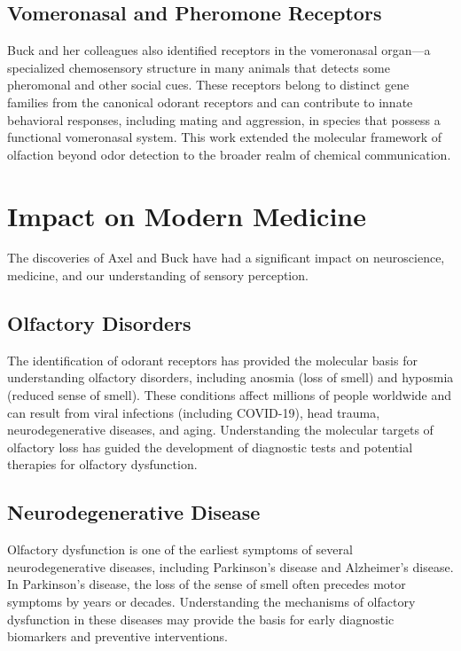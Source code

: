 \subsection{Vomeronasal and Pheromone Receptors}

Buck and her colleagues also identified receptors in the vomeronasal organ---a specialized chemosensory structure in many animals that detects some pheromonal and other social cues. These receptors belong to distinct gene families from the canonical odorant receptors and can contribute to innate behavioral responses, including mating and aggression, in species that possess a functional vomeronasal system. This work extended the molecular framework of olfaction beyond odor detection to the broader realm of chemical communication.

\section{Impact on Modern Medicine}

The discoveries of Axel and Buck have had a significant impact on neuroscience, medicine, and our understanding of sensory perception.

\subsection{Olfactory Disorders}

The identification of odorant receptors has provided the molecular basis for understanding olfactory disorders, including anosmia (loss of smell) and hyposmia (reduced sense of smell). These conditions affect millions of people worldwide and can result from viral infections (including COVID-19), head trauma, neurodegenerative diseases, and aging. Understanding the molecular targets of olfactory loss has guided the development of diagnostic tests and potential therapies for olfactory dysfunction.

\subsection{Neurodegenerative Disease}

Olfactory dysfunction is one of the earliest symptoms of several neurodegenerative diseases, including Parkinson's disease and Alzheimer's disease. In Parkinson's disease, the loss of the sense of smell often precedes motor symptoms by years or decades. Understanding the mechanisms of olfactory dysfunction in these diseases may provide the basis for early diagnostic biomarkers and preventive interventions.

